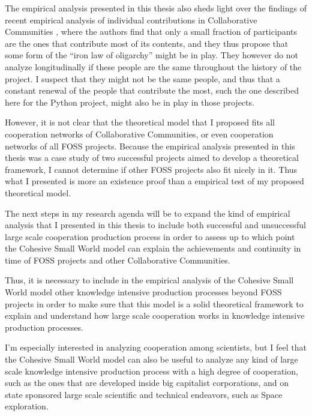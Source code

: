 The empirical analysis presented in this thesis also sheds light over the findings of recent empirical analysis of individual contributions in Collaborative Communities \citep{shaw:2014}, where the authors find that only a small fraction of participants are the ones that contribute most of its contents, and they thus propose that some form of the ``iron law of oligarchy'' \citep{michels:1915} might be in play. They however do not analyze longitudinally if these people are the same throughout the history of the project. I suspect that they might not be the same people, and thus that a constant renewal of the people that contribute the most, such the one described here for the Python project, might also be in play in those projects. 

However, it is not clear that the theoretical model that I proposed fits all cooperation networks of Collaborative Communities, or even cooperation networks of all FOSS projects. Because the empirical analysis presented in this thesis was a case study of two successful projects aimed to develop a theoretical framework, I cannot determine if other FOSS projects also fit nicely in it. Thus what I presented is more an existence proof than a empirical test of my proposed theoretical model.

The next steps in my research agenda will be to expand the kind of empirical analysis that I presented in this thesis to include both successful and unsuccessful large scale cooperation production process in order to assess up to which point the Cohesive Small World model can explain the achievements and continuity in time of FOSS projects and other Collaborative Communities.

Thus, it is necessary to include in the empirical analysis of the Cohesive Small World model other knowledge intensive production processes beyond FOSS projects in order to make sure that this model is a solid theoretical framework to explain and understand how large scale cooperation works in knowledge intensive production processes.

I'm especially interested in analyzing cooperation among scientists, but I feel that the Cohesive Small World model can also be useful to analyze any kind of large scale knowledge intensive production process with a high degree of cooperation, such as the ones that are developed inside big capitalist corporations, and on state sponsored large scale scientific and technical endeavors, such as Space exploration.
